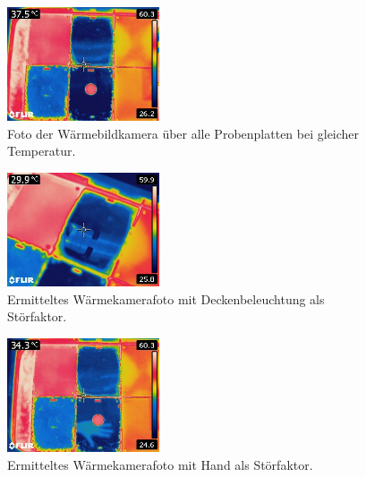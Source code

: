 \begin{figure}[H]
		\centering
		\includegraphics[width=0.4\textwidth]{../FLIR_100/FLIR2241.jpg}
		\caption{Foto der Wärmebildkamera über alle Probenplatten bei gleicher Temperatur.}
		\label{fig:FotoWBK}
\end{figure}

\begin{figure}[H]
		\centering
		\includegraphics[width=0.4\textwidth]{../FLIR_100/FLIR2249.jpg}
		\caption[Ermitteltes Wärmekamerafoto mit Deckenbeleuchtung als Störfaktor]{Ermitteltes Wärmekamerafoto mit Deckenbeleuchtung als Störfaktor.}
		\label{fig:WBKHand}
\end{figure}

\begin{figure}[H]
		\centering
		\includegraphics[width=0.4\textwidth]{../FLIR_100/FLIR2243.jpg}
		\caption[Ermitteltes Wärmekamerafoto mit Hand als Störfaktor]{Ermitteltes Wärmekamerafoto mit Hand als Störfaktor.}
		\label{fig:WBKDecke}
\end{figure}
